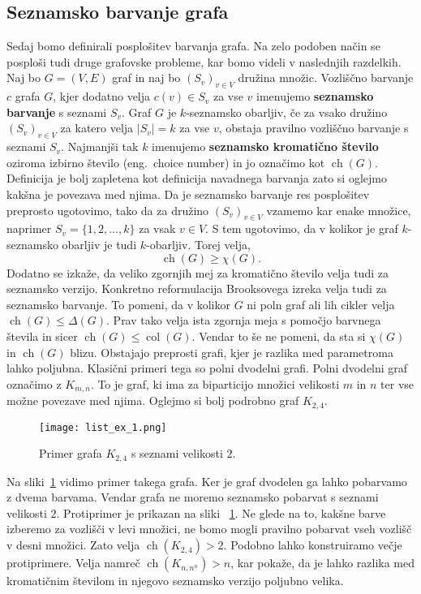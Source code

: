\documentclass[12pt,a4paper,twoside]{article}
\theoremstyle{definition} %
\theoremstyle{plain} %
\numberwithin{equation}{section}  %
\DeclareMathOperator{\col}{col}
\DeclareMathOperator{\ch}{ch}
\begin{document}
\subsection{Seznamsko barvanje grafa}
Sedaj bomo definirali posplošitev barvanja grafa. Na zelo podoben način se posploši tudi druge grafovske probleme, kar bomo videli v naslednjih razdelkih. Naj bo $G = (V, E)$ graf in naj bo $(S_v)_{v \in V}$ družina množic. Vozliščno barvanje $c$ grafa $G$, kjer dodatno velja $c(v) \in S_v$ za vse $v$ imenujemo \textbf{seznamsko barvanje} s seznami $S_v$. Graf $G$ je $k$-seznamsko obarljiv, če za vsako družino  $(S_v)_{v \in V}$ za katero velja $|S_v| = k$ za vse $v$, obstaja pravilno vozliščno barvanje s seznami $S_v$. Najmanjši tak $k$ imenujemo \textbf{seznamsko kromatično število} oziroma izbirno število (eng.\ choice number) in jo označimo kot $\ch(G)$.
Definicija je bolj zapletena kot definicija navadnega barvanja zato si oglejmo kakšna je povezava med njima. Da je seznamsko barvanje res posplošitev preprosto ugotovimo, tako da za družino  $(S_v)_{v \in V}$ vzamemo kar enake množice, naprimer $S_v = \{1,2, \ldots, k\}$ za vsak $v \in V$.  S tem ugotovimo, da v kolikor je graf $k$-seznamsko obarljiv je tudi $k$-obarljiv. Torej velja, 
$$ \ch(G) \ge \chi(G).$$
Dodatno se izkaže, da veliko zgornjih mej za kromatično število velja tudi za seznamsko verzijo. Konkretno reformulacija Brooksovega izreka velja tudi za seznamsko barvanje. To pomeni, da v kolikor $G$ ni poln graf ali lih cikler velja $\ch(G) \le \Delta(G)$.  Prav tako velja ista zgornja meja s pomočjo barvnega števila in sicer $\ch(G) \le \col(G)$. Vendar to še ne pomeni, da sta si $\chi(G)$ in $\ch(G)$ blizu. Obstajajo preprosti grafi, kjer je razlika med parametroma lahko poljubna. Klasični primeri tega so polni dvodelni grafi. Polni dvodelni graf označimo z $K_{m,n}$. To je graf, ki ima za biparticijo množici velikosti $m$ in $n$ ter vse možne povezave med njima. Oglejmo si bolj podrobno graf $K_{2, 4}$.

 \begin{figure}[h!]
\caption{Primer grafa $K_{2, 4}$ s seznami velikosti $2$.}
\label{list_ex_1}
\centering
    \texttt{[image: list\_ex\_1.png]}
    \end{figure}
Na sliki~\ref{list_ex_1} vidimo primer takega grafa. Ker je graf dvodelen ga lahko pobarvamo z dvema barvama. Vendar grafa ne moremo seznamsko pobarvat s seznami velikosti $2$. Protiprimer je prikazan na sliki ~\ref{list_ex_1}. Ne glede na to, kakšne barve izberemo za vozlišči v levi množici, ne bomo mogli pravilno pobarvat vseh vozlišč v desni množici. Zato velja $\ch(K_{2, 4}) > 2$. Podobno lahko konstruiramo večje protiprimere. Velja namreč $\ch(K_{n, n^n}) > n$, kar pokaže, da je lahko razlika med kromatičnim številom in njegovo seznamsko verzijo poljubno velika.
\end{document}
